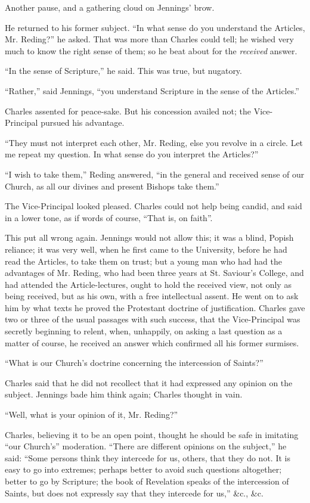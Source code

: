 Another pause, and a gathering cloud on Jennings' brow.

He returned to his former subject. ``In what sense do you
understand the Articles, Mr. Reding?'' he asked. That was more
than Charles could tell; he wished very much to know the right sense
of them; so he beat about for the \emph{received} answer.

``In the sense of Scripture,'' he said. This was true, but
nugatory.

``Rather,'' said Jennings, ``you understand Scripture
in the sense of the Articles.''

Charles assented for peace-sake. But his concession availed not;
the Vice-Principal pursued his advantage.

``They must not interpret each other, Mr. Reding, else you
revolve in a circle. Let me repeat my question. In what sense do you
interpret the Articles?''

``I wish to take them,'' Reding answered, ``in the
general and received sense of our Church, as all our divines and
present Bishops take them.''

The Vice-Principal looked pleased. Charles could not help being
candid, and said in a lower tone, as if words of course, ``That
is, on faith''.

This put all wrong again. Jennings would not allow this; it was a
blind, Popish reliance; it was very well, when he first came to the
University, before he had read the Articles, to take them on trust;
but a young man who had had the advantages of Mr. Reding, who had been three years at St. Saviour's College, and had attended the
Article-lectures, ought to hold the received view, not only as being
received, but as his own, with a free intellectual assent. He went on
to ask him by what texts he proved the Protestant doctrine of
justification. Charles gave two or three of the usual passages with
such success, that the Vice-Principal was secretly beginning to
relent, when, unhappily, on asking a last question as a matter of
course, he received an answer which confirmed all his former surmises.

``What is our Church's doctrine concerning the intercession of
Saints?''

Charles said that he did not recollect that it had expressed any
opinion on the subject. Jennings bade him think again; Charles thought
in vain.

``Well, what is your opinion of it, Mr. Reding?''

Charles, believing it to be an open point, thought he should be
safe in imitating ``our Church's'' moderation. ``There are
different opinions on the subject,'' he said: ``Some persons
think they intercede for us, others, that they do not. It is easy to
go into extremes; perhaps better to avoid such questions altogether;
better to go by Scripture; the book of Revelation speaks of the
intercession of Saints, but does not expressly say that they intercede
for us,'' \&c., \&c.

